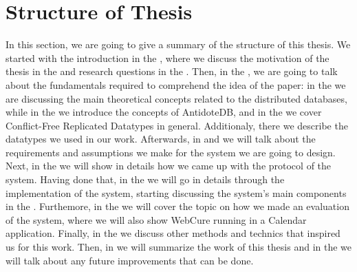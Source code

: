 \section{Structure of Thesis}

In this section, we are going to give a summary of the structure of this thesis. We started with the introduction in the , where we discuss the motivation of the thesis in the  and research questions in the . Then, in the , we are going to talk about the fundamentals required to comprehend the idea of the paper: in the  we are discussing the main theoretical concepts related to the distributed databases, while in the  we introduce the concepts of AntidoteDB, and in the  we cover Conflict-Free Replicated Datatypes in general. Additionaly, there we describe the datatypes we used in our work. Afterwards, in  and  we will talk about the requirements and assumptions we make for the system we are going to design. Next, in the  we will show in details how we came up with the protocol of the system. Having done that, in the  we will go in details through the implementation of the system, starting discussing the system's main components in the . Furthemore, in the  we will cover the topic on how we made an evaluation of the system, where we will also show WebCure running in a Calendar application. Finally, in the  we discuss other methods and technics that inspired us for this work. Then, in  we will summarize the work of this thesis and in the  we will talk about any future improvements that can be done. 
